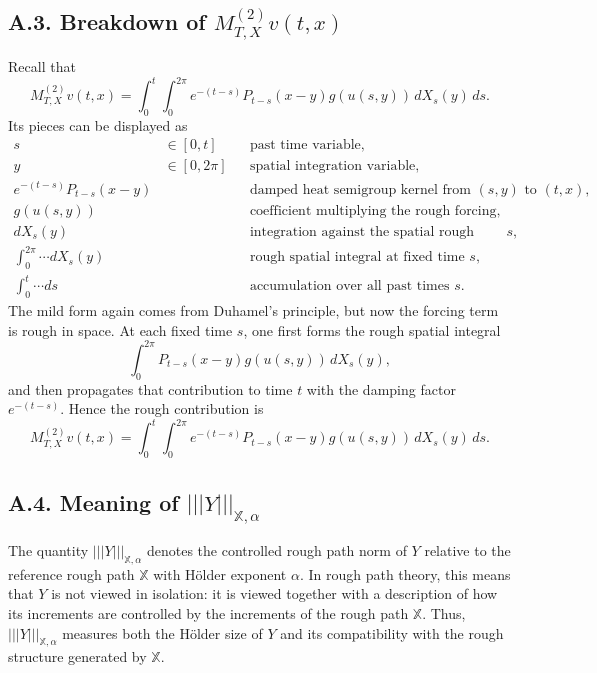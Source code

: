 \documentclass[11pt]{article}
\theoremstyle{definition}
\theoremstyle{remark}
\begin{document}
\subsection*{A.3. Breakdown of $M_{T,X}^{(2)}v(t,x)$}
Recall that
\[
M_{T,X}^{(2)}v(t,x)=\int_0^t\int_0^{2\pi} e^{-(t-s)}P_{t-s}(x-y)g(u(s,y))\,dX_s(y)\,ds.
\]
Its pieces can be displayed as
\[
\begin{aligned}
s &\in [0,t] && \text{past time variable},\\
y &\in [0,2\pi] && \text{spatial integration variable},\\
e^{-(t-s)}P_{t-s}(x-y) &&& \text{damped heat semigroup kernel from } (s,y) \text{ to } (t,x),\\
g(u(s,y)) &&& \text{coefficient multiplying the rough forcing},\\
dX_s(y) &&& \text{integration against the spatial rough signal at time } s,\\
\int_0^{2\pi}\cdots dX_s(y) &&& \text{rough spatial integral at fixed time } s,\\
\int_0^t \cdots ds &&& \text{accumulation over all past times } s.
\end{aligned}
\]
The mild form again comes from Duhamel's principle, but now the forcing term is rough in space. At each fixed time $s$, one first forms the rough spatial integral
\[
\int_0^{2\pi} P_{t-s}(x-y)g(u(s,y))\,dX_s(y),
\]
and then propagates that contribution to time $t$ with the damping factor $e^{-(t-s)}$. Hence the rough contribution is
\[
M_{T,X}^{(2)}v(t,x)
=
\int_0^t
\int_0^{2\pi}
e^{-(t-s)}P_{t-s}(x-y)g(u(s,y))\,dX_s(y)\,ds.
\]

\subsection*{A.4. Meaning of $|||Y|||_{\mathbb X,\alpha}$}
The quantity $|||Y|||_{\mathbb X,\alpha}$ denotes the controlled rough path norm of $Y$ relative to the reference rough path $\mathbb X$ with H\"older exponent $\alpha$. In rough path theory, this means that $Y$ is not viewed in isolation: it is viewed together with a description of how its increments are controlled by the increments of the rough path $\mathbb X$. Thus, $|||Y|||_{\mathbb X,\alpha}$ measures both the H\"older size of $Y$ and its compatibility with the rough structure generated by $\mathbb X$.
\end{document}
